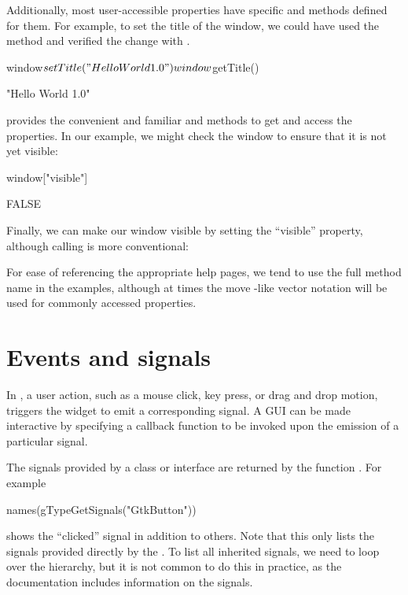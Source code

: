 Additionally, most user-accessible properties have specific  and
 methods defined for them. For example, to set the title of
the window, we could have used the  method
and verified the change with .
\begin{Schunk}
\begin{Sinput}
 window$setTitle("Hello World 1.0")
 window$getTitle()
\end{Sinput}
\begin{Soutput}
[1] "Hello World 1.0"
\end{Soutput}
\end{Schunk}

 provides the convenient and familiar \code{[} and
\code{[$<$-} methods to get and access the properties. In our example,
we might check the window to ensure that it is not yet visible:
\begin{Schunk}
\begin{Sinput}
 window["visible"]
\end{Sinput}
\begin{Soutput}
[1] FALSE
\end{Soutput}
\end{Schunk}
Finally, we can make our window visible by setting the ``visible'' property,
although calling  is more conventional:
\begin{Schunk}
\end{Schunk}

For ease of referencing the appropriate help pages, we tend to use the
full method name in the examples, although at times the move \R-like
vector notation will be used for commonly accessed properties.


\section{Events and signals}

In , a user action, such as a mouse click, key press, or
drag and drop motion, triggers the widget to emit a corresponding
signal.  A GUI can be made interactive by specifying a callback
function to be invoked upon the emission of a particular signal.

The signals provided by a class or interface are returned by the
function . For example
\begin{Schunk}
\begin{Sinput}
 names(gTypeGetSignals("GtkButton"))
\end{Sinput}
\end{Schunk}
shows the ``clicked'' signal in addition to others. Note that this
only lists the signals provided directly by the . To
list all inherited signals, we need to loop over the hierarchy, but it
is not common to do this in practice, as the documentation includes
information on the signals.

